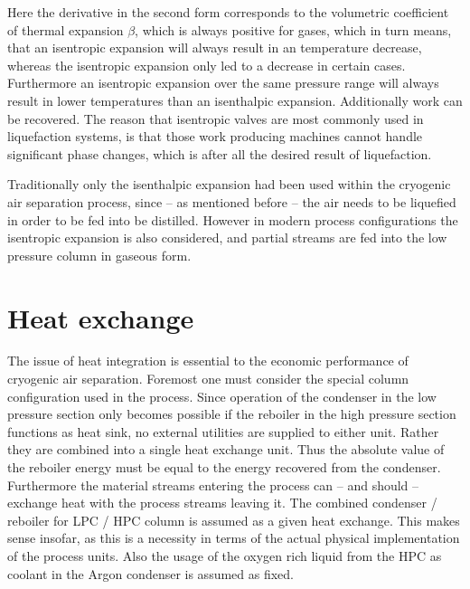        Here the derivative in the second form corresponds to the volumetric coefficient of thermal expansion
        $\beta$, which is always positive for gases, which in turn means, that an isentropic expansion
        will always result in an temperature decrease, whereas the isentropic expansion only led to a decrease in
        certain cases. Furthermore an isentropic expansion over the same pressure range will always result in
        lower temperatures than an isenthalpic expansion. Additionally work can be recovered. The reason
        that isentropic valves are most commonly used in liquefaction systems, is that those work producing
        machines cannot handle significant phase changes, which is after all the desired result of liquefaction.

        Traditionally only the isenthalpic expansion had been used within the cryogenic air separation process,
        since -- as mentioned before -- the air needs to be liquefied in order to be fed into be distilled. However
        in modern process configurations the isentropic expansion is also considered, and partial streams are fed into
        the low pressure column in gaseous form.


\section{Heat exchange}
\label{sec:heat_exchange}
    The issue of heat integration is essential to the economic performance of cryogenic air separation. Foremost
    one must consider the special column configuration used in the process. Since operation of the condenser in the
    low pressure section only becomes possible if the reboiler in the high pressure section functions as heat sink,
    no external utilities are supplied to either unit. Rather they are combined into a single heat exchange unit. Thus
    the absolute value of the reboiler energy must be equal to the energy recovered from the condenser. Furthermore
    the material streams entering the process can -- and should -- exchange heat with the process streams leaving it.
    The combined condenser / reboiler for LPC / HPC column is assumed as a given heat exchange. This makes sense insofar,
    as this is a necessity in terms of the actual physical implementation of the process units. Also the usage of the
    oxygen rich liquid from the HPC as coolant in the Argon condenser is assumed as fixed.



